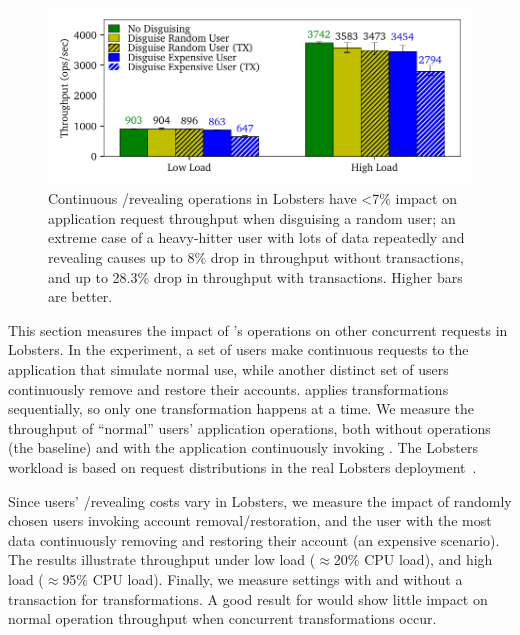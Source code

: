 \begin{figure}[t]
    \centering
    \includegraphics[width=\columnwidth]{figs/lobsters_concurrent_results}
    \caption[Impact of continuously disguising and revealing on
    application request throughput.]{Continuous \xxing/revealing operations in Lobsters
    have <7\% impact on application request throughput when disguising a
    random user; an extreme case of a heavy-hitter user with lots of data
    repeatedly \xxing and revealing causes up to 8\% drop in throughput without
    transactions, and up to 28.3\% drop in throughput with transactions. Higher
    bars are better.}
    \label{f:concurrent-lobsters}
\end{figure}


%
This section measures the impact of \sys's operations on other concurrent requests
in Lobsters.
%
In the experiment, a set of users make continuous requests to the
application that simulate normal use, while another distinct set of users
continuously remove and restore their accounts.
%
\sys applies \xxing transformations sequentially, so only one transformation
happens at a time.
%
%
We measure the throughput of ``normal'' users' application operations, both
without \sys operations (the baseline) and with the application continuously
invoking \sys.
%
The Lobsters workload is based on request distributions in the real
Lobsters deployment~\cite{lobsters-data}.
%

%
Since users' \xxing/revealing costs vary in Lobsters, we measure the
impact of \one{} randomly chosen users invoking account removal/restoration, and
\two{} the user with the most data continuously removing and restoring their
account (an expensive scenario).
%
The results illustrate throughput under low load ($\approx$20\% CPU load),
and high load ($\approx$95\% CPU load).
%
Finally, we measure settings with and without a transaction for \sys
transformations.
%
%
A good result for \sys would show little impact on normal operation throughput
when concurrent \xxing transformations occur.
%

